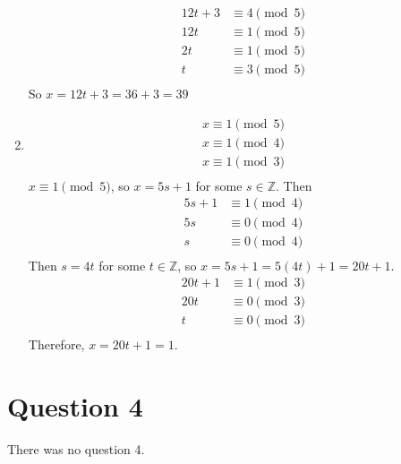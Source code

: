 \documentclass[openany]{report}
\begin{document}
\begin{enumerate}[label=(\alph*)]
\begin{align*}
        12t + 3 &\equiv 4 \pmod{5}\\
        12t &\equiv 1 \pmod{5}\\
        2t &\equiv 1 \pmod{5}\\
        t &\equiv 3 \pmod{5}\\
    \end{align*}
    So $x = 12t + 3 = 36 +3 = 39$
    \item 
    \begin{align*}
        x \equiv 1 \pmod{5} \\
        x \equiv 1 \pmod{4} \\
        x \equiv 1 \pmod{3} \\
    \end{align*}
    $x \equiv 1 \pmod{5}$, so $x = 5s + 1$ for some $s \in \mathbb{Z}$. Then 
    \begin{align*}
        5s + 1 &\equiv 1 \pmod{4}\\
        5s &\equiv 0 \pmod{4}\\
        s &\equiv 0 \pmod{4}\\
    \end{align*}
    Then $s = 4t$ for some $t \in \mathbb{Z}$, so $x = 5s + 1 = 5(4t) + 1 = 20t + 1$.
    \begin{align*}
        20t + 1 &\equiv 1 \pmod{3}\\
        20t &\equiv 0 \pmod{3}\\
        t &\equiv 0 \pmod{3}\\
    \end{align*}
    Therefore, $x = 20t + 1 = 1$. 
    
\end{enumerate}
\section{Question 4}
There was no question 4.
\end{document}
